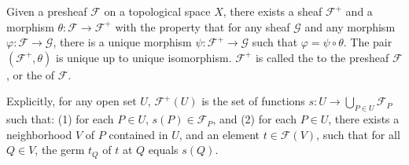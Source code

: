 Given a presheaf $\mathcal{F}$ on a topological space $X$, there exists a sheaf $\mathcal{F}^+$ and a morphism $\theta: \mathcal{F} \rightarrow \mathcal{F}^+$ with the property that for any sheaf $\mathcal{G}$ and any morphism $\varphi: \mathcal{F} \rightarrow \mathcal{G}$, there is a unique morphism $\psi: \mathcal{F}^+ \rightarrow \mathcal{G}$ such that $\varphi = \psi \circ \theta$. The pair $(\mathcal{F}^+, \theta)$ is unique up to unique isomorphism. $\mathcal{F}^+$ is called the  to the presheaf $\mathcal{F}$, or the  of $\mathcal{F}$.

Explicitly, for any open set $U$, $\mathcal{F}^+(U)$ is the set of functions $s: U \rightarrow \bigcup_{P \in U} \mathcal{F}_P$ such that:
(1) for each $P \in U$, $s(P) \in \mathcal{F}_P$, and
(2) for each $P \in U$, there exists a neighborhood $V$ of $P$ contained in $U$, and an element $t \in \mathcal{F}(V)$, such that for all $Q \in V$, the germ $t_Q$ of $t$ at $Q$ equals $s(Q)$.
